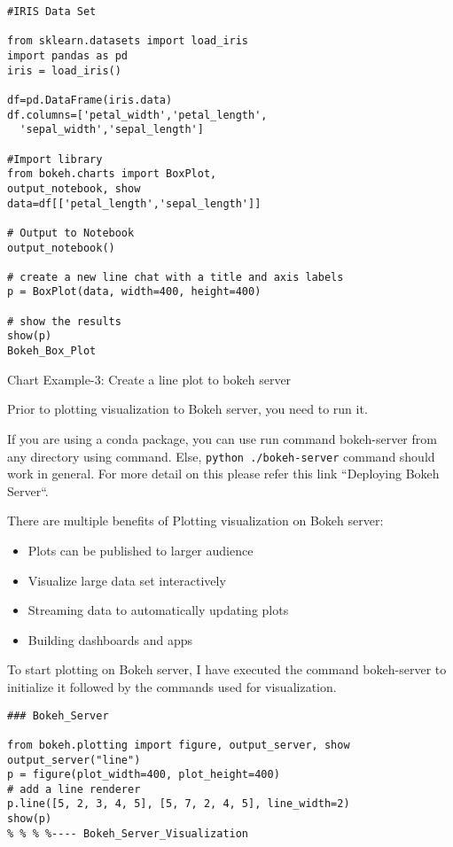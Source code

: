 \documentclass[a4paper,12pt]{article}
\begin{document}
\newpage


\begin{verbatim}
#IRIS Data Set

from sklearn.datasets import load_iris
import pandas as pd
iris = load_iris()

df=pd.DataFrame(iris.data)
df.columns=['petal_width','petal_length',
  'sepal_width','sepal_length']

#Import library
from bokeh.charts import BoxPlot,   
output_notebook, show
data=df[['petal_length','sepal_length']]

# Output to Notebook
output_notebook()

# create a new line chat with a title and axis labels
p = BoxPlot(data, width=400, height=400)

# show the results
show(p)
Bokeh_Box_Plot
\end{verbatim}

\newpage

Chart Example-3: Create a line plot to bokeh server

Prior to plotting visualization to Bokeh server, you need to run it.

If you are using a conda package, you can use run command bokeh-server from any directory 
using command. Else, \texttt{python ./bokeh-server} command should work in general. For more detail on this 
please refer this link “Deploying Bokeh Server“.

There are multiple benefits of Plotting visualization on Bokeh server:

\begin{itemize}
\item Plots can be published to larger audience
\item Visualize large data set interactively
\item Streaming data to automatically updating plots
\item Building dashboards and apps
\end{itemize}
To start plotting on Bokeh server, I have executed the command bokeh-server to initialize it followed by 
the commands used for visualization.
\begin{framed}
	\begin{verbatim}
### Bokeh_Server

from bokeh.plotting import figure, output_server, show
output_server("line")
p = figure(plot_width=400, plot_height=400)
# add a line renderer
p.line([5, 2, 3, 4, 5], [5, 7, 2, 4, 5], line_width=2)
show(p)
% % % %---- Bokeh_Server_Visualization
\end{verbatim}
\end{framed}
\end{document}
